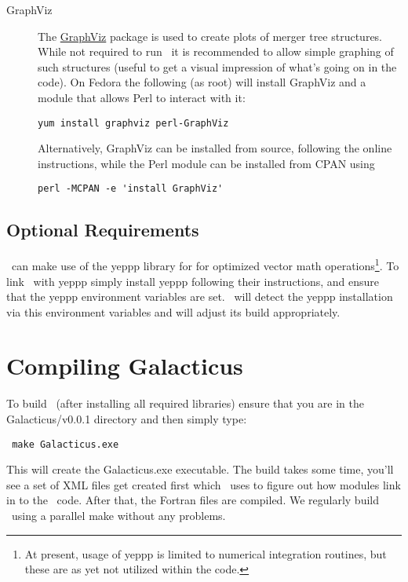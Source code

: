 \begin{description}
\item[GraphViz] The \href{http://www.graphviz.org/}{GraphViz} package is used to create plots of merger tree structures. While not required to run \glc\ it is recommended to allow simple graphing of such structures (useful to get a visual impression of what's going on in the code). On Fedora the following (as root) will install GraphViz and a module that allows Perl to interact with it:
\begin{verbatim}
yum install graphviz perl-GraphViz
\end{verbatim}
Alternatively, GraphViz can be installed from source, following the online instructions, while the Perl module can be installed from CPAN using
\begin{verbatim}
perl -MCPAN -e 'install GraphViz'
\end{verbatim}

\end{description}

\subsection{Optional Requirements}

\glc\ can make use of the \gls{yeppp} library for for optimized vector math operations\footnote{At present, usage of \protect\gls{yeppp} is limited to numerical integration routines, but these are as yet not utilized within the code.}. To link \glc\ with \gls{yeppp} simply install \gls{yeppp} following their instructions, and ensure that the \gls{yeppp} environment variables are set. \glc\ will detect the \gls{yeppp} installation via this environment variables and will adjust its build appropriately.

\section{Compiling Galacticus}

To build \glc\ (after installing all required libraries) ensure that you are in the {\normalfont \ttfamily Galacticus/v0.0.1} directory and then simply type:
\begin{verbatim}
 make Galacticus.exe
\end{verbatim}
This will create the {\normalfont \ttfamily Galacticus.exe} executable. The build takes some time, you'll see a set of XML files get created first which \glc\ uses to figure out how modules link in to the \glc\ code. After that, the Fortran files are compiled. We regularly build \glc\ using a parallel make without any problems.

